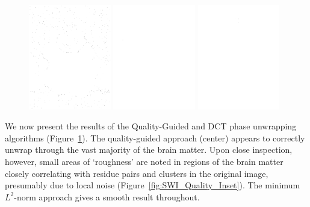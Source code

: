 \begin{figure}
\center
\includegraphics[width=0.32\textwidth]{images/input/wrapped_swi.png}
\includegraphics[width=0.32\textwidth]{images/swi/03e_qg_unwrap.png}
\includegraphics[width=0.32\textwidth]{images/swi/03f_dct_unwrap.png}

\label{fig:SWI_Unwrap}
\end{figure}

We now present the results of the Quality-Guided and DCT phase unwrapping algorithms (Figure~\ref{fig:SWI_Unwrap}).  The quality-guided approach (center) appears to correctly unwrap through the vast majority of the brain matter.  Upon close inspection, however, small areas of `roughness' are noted in regions of the brain matter closely correlating with residue pairs and clusters in the original image, presumably due to local noise (Figure~\ref{fig:SWI_Quality_Inset}).  The minimum $L^2$-norm approach gives a smooth result throughout.


